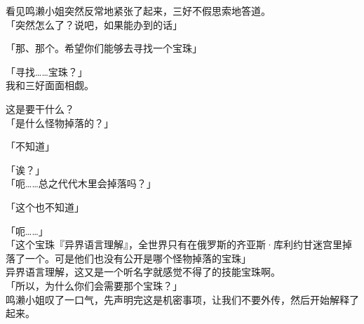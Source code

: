 看见鸣濑小姐突然反常地紧张了起来，三好不假思索地答道。\\

「突然怎么了？说吧，如果能办到的话」

「那、那个。希望你们能够去寻找一个宝珠」

「寻找……宝珠？」\\

我和三好面面相觑。

这是要干什么？\\

「是什么怪物掉落的？」

「不知道」

「诶？」\\

「呃……总之代代木里会掉落吗？」

「这个也不知道」

「呃……」\\

「这个宝珠『异界语言理解』，全世界只有在俄罗斯的齐亚斯·库利约甘迷宫里掉落了一个。可是他们也没有公开是哪个怪物掉落的宝珠」\\

异界语言理解，这又是一个听名字就感觉不得了的技能宝珠啊。\\

「所以，为什么你们会需要那个宝珠？」\\

鸣濑小姐叹了一口气，先声明完这是机密事项，让我们不要外传，然后开始解释了起来。\\

